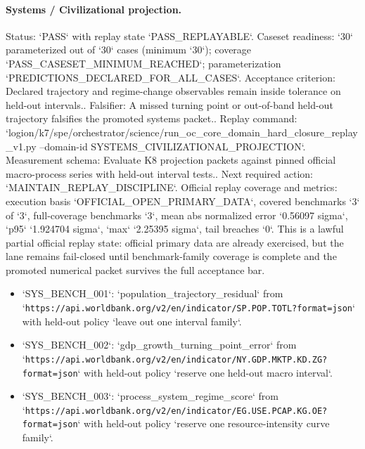 \paragraph{Systems / Civilizational projection.}
Status: `PASS` with replay state `PASS\_REPLAYABLE`.
Caseset readiness: `30` parameterized out of `30` cases (minimum `30`); coverage `PASS\_CASESET\_MINIMUM\_REACHED`; parameterization `PREDICTIONS\_DECLARED\_FOR\_ALL\_CASES`.
Acceptance criterion: Declared trajectory and regime-change observables remain inside tolerance on held-out intervals..
Falsifier: A missed turning point or out-of-band held-out trajectory falsifies the promoted systems packet..
Replay command: `logion/k7/spe/orchestrator/science/run\_oc\_core\_domain\_hard\_closure\_replay\_v1.py --domain-id SYSTEMS\_CIVILIZATIONAL\_PROJECTION`.
Measurement schema: Evaluate K8 projection packets against pinned official macro-process series with held-out interval tests..
Next required action: `MAINTAIN\_REPLAY\_DISCIPLINE`.
Official replay coverage and metrics: execution basis `OFFICIAL\_OPEN\_PRIMARY\_DATA`, covered benchmarks `3` of `3`, full-coverage benchmarks `3`, mean abs normalized error `0.56097 sigma`, `p95` `1.924704 sigma`, `max` `2.25395 sigma`, tail breaches `0`.
This is a lawful partial official replay state: official primary data are already exercised, but the lane remains fail-closed until benchmark-family coverage is complete and the promoted numerical packet survives the full acceptance bar.
\begin{itemize}
\item `SYS\_BENCH\_001`: `population\_trajectory\_residual` from `\texttt{https://api.worldbank.org/v2/en/indicator/SP.POP.TOTL?format=json}` with held-out policy `leave out one interval family`.
\item `SYS\_BENCH\_002`: `gdp\_growth\_turning\_point\_error` from `\texttt{https://api.worldbank.org/v2/en/indicator/NY.GDP.MKTP.KD.ZG?format=json}` with held-out policy `reserve one held-out macro interval`.
\item `SYS\_BENCH\_003`: `process\_system\_regime\_score` from `\texttt{https://api.worldbank.org/v2/en/indicator/EG.USE.PCAP.KG.OE?format=json}` with held-out policy `reserve one resource-intensity curve family`.
\end{itemize}
